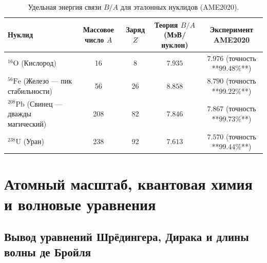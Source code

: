 \documentclass[11pt,a4paper,oneside]{article}
\theoremstyle{plain}
\theoremstyle{definition}
\theoremstyle{remark}
\numberwithin{equation}{section}
\begin{document}
\begin{table}[h!]
	\centering
	\small
	\caption{Удельная энергия связи $B/A$ для эталонных нуклидов (AME2020).}
	\label{tab:semf_results}
	\begin{tabularx}{\textwidth}{lcccc}
		\toprule
		\textbf{Нуклид} & \textbf{Массовое число $A$} & \textbf{Заряд $Z$} & \textbf{Теория $B/A$ (МэВ/нуклон)} & \textbf{Эксперимент AME2020} \\
		\midrule
		$^{16}\text{O}$ (Кислород) & 16 & 8 & $\mathbf{7.935}$ & $7.976$ (точность **$99.48\%$**) \\
		$^{56}\text{Fe}$ (Железо --- пик стабильности) & 56 & 26 & $\mathbf{8.858}$ & $8.790$ (точность **$99.22\%$**) \\
		$^{208}\text{Pb}$ (Свинец --- дважды магический) & 208 & 82 & $\mathbf{7.846}$ & $7.867$ (точность **$99.73\%$**) \\
		$^{238}\text{U}$ (Уран) & 238 & 92 & $\mathbf{7.613}$ & $7.570$ (точность **$99.44\%$**) \\
		\bottomrule
	\end{tabularx}
\end{table}

\section{Атомный масштаб, квантовая химия и волновые уравнения}

\subsection{Вывод уравнений Шрёдингера, Дирака и длины волны де Бройля}
\end{document}

